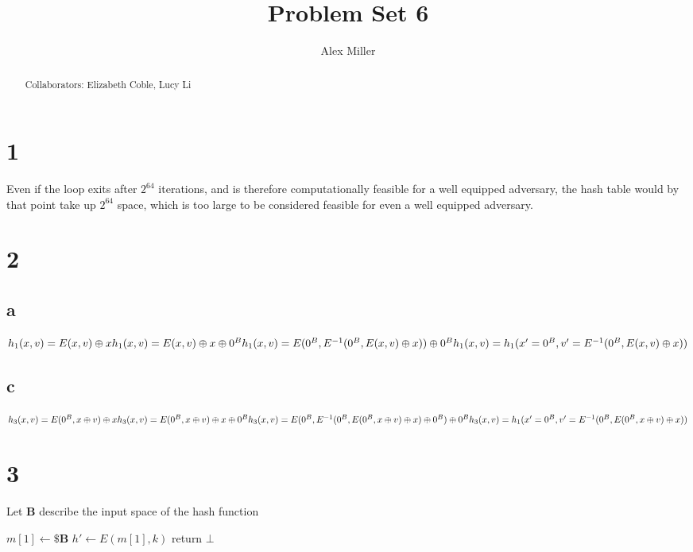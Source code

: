 \documentclass[]{article}
\title{Problem Set 6}
\author{Alex Miller}
\begin{document}
\maketitle

\begin{abstract}
	Collaborators: Elizabeth Coble, Lucy Li
\end{abstract}

\section{1}
Even if the loop exits after $2^{64}$ iterations, and is therefore computationally feasible for a well equipped adversary, the hash table would by that point take up $2^{64}$ space, which is too large to be considered feasible for even a well equipped adversary. 

\section{2}
\subsection{a}
$h_1(x, v) = E(x, v) \oplus x \\
 h_1(x, v) = E(x, v) \oplus x \oplus 0^B \\
 h_1(x, v) = E(0^B, E^{-1}(0^B, E(x, v) \oplus x)) \oplus 0^B \\
 h_1(x, v) = h_1(x' = 0^B, v' = E^{-1}(0^B, E(x, v) \oplus x))$  

\subsection{c}
$h_3(x, v) = E(0^B, x \oplus v) \oplus x \\
 h_3(x, v) = E(0^B, x \oplus v) \oplus x \oplus 0^B \\
 h_3(x, v) = E(0^B, E^{-1}(0^B,  E(0^B, x \oplus v) \oplus x) \oplus 0^B) \oplus 0^B \\
 h_3(x, v) = h_1(x' = 0^B, v' = E^{-1}(0^B, E(0^B, x \oplus v) \oplus x))$
 
\section{3}
Let $\textbf{B}$ describe the input space of the hash function
\\
\begin{algorithm}[H]
\SetAlgoLined
$m[1] \leftarrow \$ \textbf{B}$\;
$h' \leftarrow E(m[1], k)$\;
return $\bot$
\caption{$A(k, y)$}
\end{algorithm}
\end{document}
